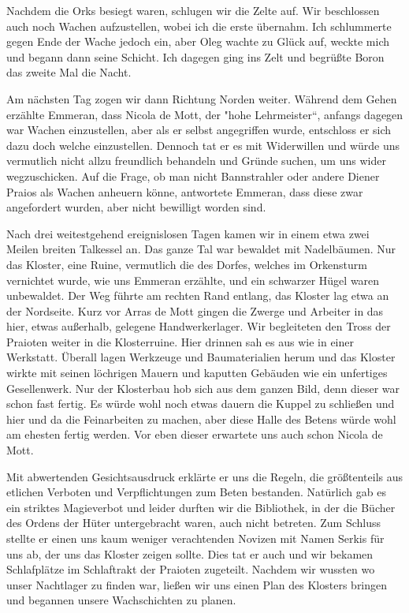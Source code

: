 \documentclass[11pt]{scrreprt}
\begin{document}
Nachdem die Orks besiegt waren, schlugen wir die Zelte auf. Wir beschlossen auch noch Wachen aufzustellen, wobei ich die erste übernahm. Ich schlummerte gegen Ende der Wache jedoch ein, aber Oleg wachte zu Glück auf, weckte mich und begann dann seine Schicht. Ich dagegen ging ins Zelt und begrüßte Boron das zweite Mal die Nacht.\par
Am nächsten Tag zogen wir dann Richtung Norden weiter. Während dem Gehen erzählte Emmeran, dass Nicola de Mott, der "hohe Lehrmeister“, anfangs dagegen war Wachen einzustellen, aber als er selbst angegriffen wurde, entschloss er sich dazu doch welche einzustellen. Dennoch tat er es mit Widerwillen und würde uns vermutlich nicht allzu freundlich behandeln und Gründe suchen, um uns wider wegzuschicken. Auf die Frage, ob man nicht Bannstrahler oder andere Diener Praios als Wachen anheuern könne, antwortete Emmeran, dass diese zwar angefordert wurden, aber nicht bewilligt worden sind. \par

Nach drei weitestgehend ereignislosen Tagen kamen wir in einem etwa zwei Meilen breiten Talkessel an. Das ganze Tal war bewaldet mit Nadelbäumen. Nur das Kloster, eine Ruine, vermutlich die des Dorfes, welches im Orkensturm vernichtet wurde, wie uns Emmeran erzählte, und ein schwarzer Hügel waren unbewaldet. Der Weg führte am rechten Rand entlang, das Kloster lag etwa an der Nordseite. Kurz vor Arras de Mott gingen die Zwerge und Arbeiter in das hier, etwas außerhalb, gelegene Handwerkerlager. Wir begleiteten den Tross der Praioten weiter in die Klosterruine. Hier drinnen sah es aus wie in einer Werkstatt. Überall lagen Werkzeuge und Baumaterialien herum und das Kloster wirkte mit seinen löchrigen Mauern und kaputten Gebäuden wie ein unfertiges Gesellenwerk. Nur der Klosterbau hob sich aus dem ganzen Bild, denn dieser war schon fast fertig. Es würde wohl noch etwas dauern die Kuppel zu schließen und hier und da die Feinarbeiten zu machen, aber diese Halle des Betens würde wohl am ehesten fertig werden. Vor eben dieser erwartete uns auch schon Nicola de Mott. \par

Mit abwertenden Gesichtsausdruck erklärte er uns die Regeln, die größtenteils aus etlichen Verboten und Verpflichtungen zum Beten bestanden. Natürlich gab es ein striktes Magieverbot und leider durften wir die Bibliothek, in der die Bücher des Ordens der Hüter untergebracht waren, auch nicht betreten. Zum Schluss stellte er einen uns kaum weniger verachtenden Novizen mit Namen Serkis für uns ab, der uns das Kloster zeigen sollte. Dies tat er auch und wir bekamen Schlafplätze im Schlaftrakt der Praioten zugeteilt. Nachdem wir wussten wo unser Nachtlager zu finden war, ließen wir uns einen Plan des Klosters bringen und begannen unsere Wachschichten zu planen. \par
\end{document}
